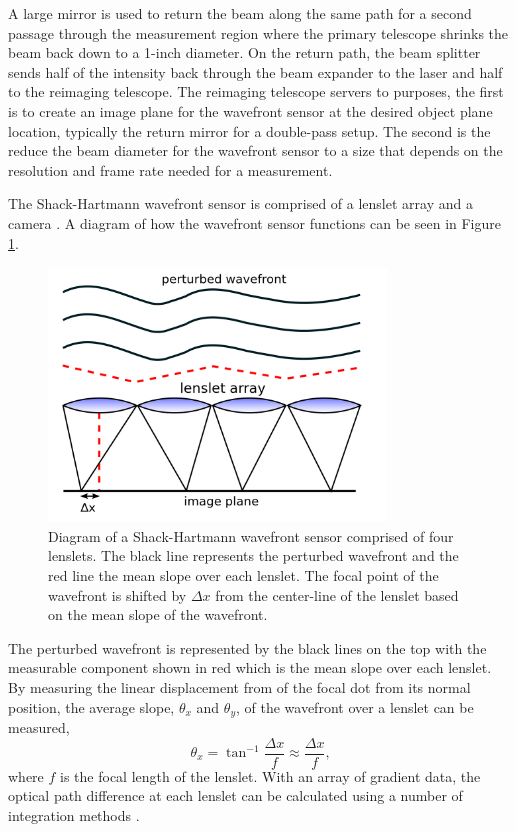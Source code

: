 A large mirror is used to return the beam along the same path for a second passage through the measurement region where the primary telescope shrinks the beam back down to a 1-inch diameter.
On the return path, the beam splitter sends half of the intensity back through the beam expander to the laser and half to the reimaging telescope.
The reimaging telescope servers to purposes, the first is to create an image plane for the wavefront sensor at the desired object plane location, typically the return mirror for a double-pass setup.
The second is the reduce the beam diameter for the wavefront sensor to a size that depends on the resolution and frame rate needed for a measurement.

The Shack-Hartmann wavefront sensor is comprised of a lenslet array and a camera \cite{Geary-1995-TQXWWFW2}.
A diagram of how the wavefront sensor functions can be seen in Figure \ref{fig:02_lenslet_array}.
\begin{figure}
  \centering
  \includegraphics[width=0.8\textwidth]{../other-sources/Shack_Hartmann_WFS_lensletarray.png}
  \caption{Diagram of a Shack-Hartmann wavefront sensor comprised of four lenslets. The black line represents the perturbed wavefront and the red line the mean slope over each lenslet. The focal point of the wavefront is shifted by $\Delta x$ from the center-line of the lenslet based on the mean slope of the wavefront. \cite{Shack-Hartman-Diagram-Wikipedia}}
  \label{fig:02_lenslet_array}
\end{figure}
The perturbed wavefront is represented by the black lines on the top with the measurable component shown in red which is the mean slope over each lenslet.
By measuring the linear displacement from of the focal dot from its normal position, the average slope, $\theta_x$ and $\theta_y$, of the wavefront over a lenslet can be measured,
\begin{equation}
  \theta_x = \tan^{-1}{\frac{\Delta x}{f}} \approx\frac{\Delta x}{f} \textrm{,}
\end{equation}
where $f$ is the focal length of the lenslet.
With an array of gradient data, the optical path difference at each lenslet can be calculated using a number of integration methods \cite{Huang-2015-W29DqPyp}.


